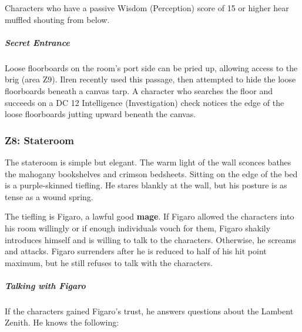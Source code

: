 \documentclass[10pt,a4paper,twoside,bg=print,twocolumn,openany,nodeprecatedcode]{dndbook}
\begin{document}
Characters who have a passive Wisdom (Perception) score of 15 or higher hear muffled shouting from below.

\subparagraph{Secret Entrance}
Loose floorboards on the room's port side can be pried up, allowing access to the brig (area Z9). Ilren recently used this passage, then attempted to hide the loose floorboards beneath a canvas tarp. A character who searches the floor and succeeds on a DC 12 Intelligence (Investigation) check notices the edge of the loose floorboards jutting upward beneath the canvas.

\subsubsection{Z8: Stateroom}
\begin{DndReadAloud}{}
The stateroom is simple but elegant. The warm light of the wall sconces bathes the mahogany bookshelves and crimson bedsheets. Sitting on the edge of the bed is a purple-skinned tiefling. He stares blankly at the wall, but his posture is as tense as a wound spring.

\end{DndReadAloud}

The tiefling is Figaro, a lawful good \textbf{mage}. If Figaro allowed the characters into his room willingly or if enough individuals vouch for them, Figaro shakily introduces himself and is willing to talk to the characters. Otherwise, he screams and attacks. Figaro surrenders after he is reduced to half of his hit point maximum, but he still refuses to talk with the characters.

\subparagraph{Talking with Figaro}
If the characters gained Figaro's trust, he answers questions about the Lambent Zenith. He knows the following:
\end{document}
